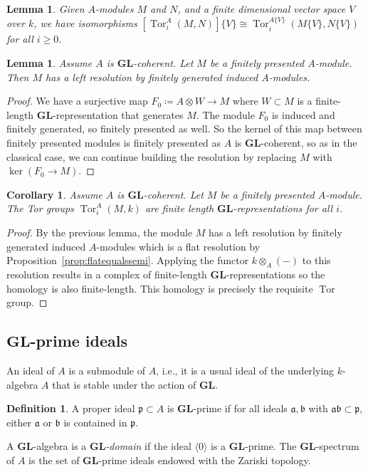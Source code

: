 \documentclass[12pt]{amsart}
\newcommand{\fa}{\mathfrak{a}}
\newcommand{\fb}{\mathfrak{b}}
\newcommand{\fp}{\mathfrak{p}}
\DeclareMathOperator{\Tor}{Tor}
\newcommand{\GL}{\mathbf{GL}}
\numberwithin{equation}{section}
\newtheorem{lemma}[equation]{Lemma}
\newtheorem{corollary}[equation]{Corollary}
\theoremstyle{definition}
\newtheorem{defn}[equation]{Definition}
\theoremstyle{plain}
\begin{document}
\begin{lemma} \label{lem:torcomparison}
Given $A$-modules $M$ and $N$, and a finite dimensional vector space $V$ over $k$, we have isomorphisms $[\Tor_i^A(M,N)]\{V\} \cong \Tor_i^{A\{V\}}(M\{V\},N\{V\})$ for all $i \geq 0$.
\end{lemma}

\begin{lemma}
Assume $A$ is $\GL$-coherent. Let $M$ be a finitely presented $A$-module. Then $M$ has a left resolution by finitely generated induced $A$-modules.
\end{lemma}
\begin{proof}
    We have a surjective map $F_0 \coloneqq A \otimes W \to M$ where $W \subset M$ is a finite-length $\GL$-representation that generates $M$. The module $F_0$ is induced and finitely generated, so finitely presented as well. So the kernel of this map between finitely presented modules is finitely presented as $A$ is $\GL$-coherent, so as in the classical case, we can continue building the resolution by replacing $M$ with $\ker(F_0 \to M)$.
\end{proof}

\begin{corollary}
    Assume $A$ is $\GL$-coherent. Let $M$ be a finitely presented $A$-module. The Tor groups $\Tor_i^A(M, k)$ are finite length $\GL$-representations for all $i$.
\end{corollary}
\begin{proof}
    By the previous lemma, the module $M$ has a left resolution by finitely generated induced $A$-modules which is a flat resolution by Proposition~\ref{prop:flatequalssemi}. Applying the functor $k \otimes_A (-)$ to this resolution results in a complex of finite-length $\GL$-representations so the homology is also finite-length. This homology is precisely the requisite $\Tor$ group.
\end{proof}

\subsection{\texorpdfstring{$\GL$}{GL}-prime ideals} \label{ss:glprimes}
An ideal of $A$ is a submodule of $A$, i.e., it is a usual ideal of the underlying $k$-algebra $A$ that is stable under the action of $\GL$.


\begin{defn}
A proper ideal $\fp \subset A$ is $\GL$-prime if for all ideals $\fa, \fb$ with $\fa \fb \subset \fp$, either $\fa$ or $\fb$ is contained in $\fp$. 
\end{defn}
A $\GL$-algebra is a \textit{$\GL$-domain} if the ideal $\langle 0 \rangle$ is a $\GL$-prime. The $\GL$-spectrum of $A$ is the set of $\GL$-prime ideals endowed with the Zariski topology. 
\end{document}
